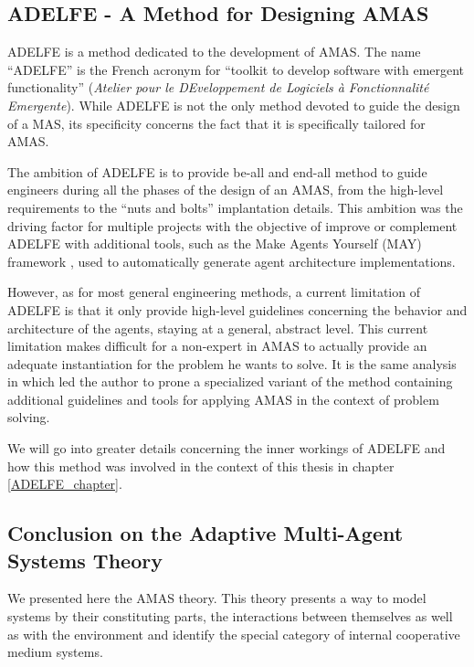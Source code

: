 \subsection{ADELFE - A Method for Designing AMAS}\label{AMAS-ADELFE}

ADELFE \cite{bernon2003adelfe} is a method dedicated to the development of AMAS. The name \enquote{ADELFE} is the French acronym for \enquote{toolkit to develop software with emergent functionality} (\textit{Atelier pour le DEveloppement de Logiciels à Fonctionnalité Emergente}). While ADELFE is not the only method devoted to guide the design of a MAS, its specificity concerns the fact that it is specifically tailored for AMAS.

The ambition of ADELFE is to provide be-all and end-all method to guide engineers during all the phases of the design of an AMAS, from the high-level requirements to the \enquote{nuts and bolts} implantation details. This ambition was the driving factor for multiple projects with the objective of improve or complement ADELFE with additional tools, such as the Make Agents Yourself (MAY) framework  \cite{No2012.2}, used to automatically generate agent architecture implementations.

However, as for most general engineering methods, a current limitation of ADELFE is that it only provide high-level guidelines concerning the behavior and architecture of the agents, staying at a general, abstract level. This current limitation makes difficult for a non-expert in AMAS to actually provide an adequate instantiation for the problem he wants to solve. It is the same analysis in \cite{Ka2011.6} which led the author to prone a specialized variant of the method containing additional guidelines and tools for applying AMAS in the context of problem solving.

We will go into greater details concerning the inner workings of ADELFE and how this method was involved in the context of this thesis in chapter \ref{ADELFE_chapter}.

\subsection{Conclusion on the Adaptive Multi-Agent Systems Theory}

We presented here the AMAS theory. This theory presents a way to model systems by their constituting parts, the interactions between themselves as well as with the environment and identify the special category of internal cooperative medium systems.

